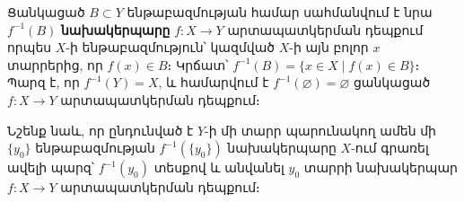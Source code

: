\documentclass[./main.tex]{subfiles}
\begin{document}
\par Ցանկացած $B\subset Y$ ենթաբազմության համար սահմանվում է նրա $f^{-1}(B)$ \textbf{նախա\-կերպարը} $f:X\rightarrow Y$ արտապատկերման դեպքում որպես $X$-ի ենթաբազմություն՝ կազմված $X$-ի այն բոլոր $x$ տարրերից, որ $f(x)\in B$։ Կրճատ՝ $f^{-1}(B)=\{x\in X\mid f(x)\in B\}$։
Պարզ է, որ $f^{-1}(Y)=X$, և համարվում է $f^{-1}(\varnothing)=\varnothing$ ցանկացած $f:X\rightarrow Y$ արտապատկերման դեպքում։

\par Նշենք նաև, որ ընդունված է $Y$-ի մի տարր պարունակող ամեն մի $\{y_0\}$ ենթա\-բազ\-մության $f^{-1}(\{y_0\})$ նախակերպարը $X$-ում գրառել ավելի պարզ՝ $f^{-1}(y_0)$ տեսքով և անվանել $y_0$ տարրի նախակերպար $f : X \rightarrow Y$ արտապատկերման դեպքում։




\end{document}
